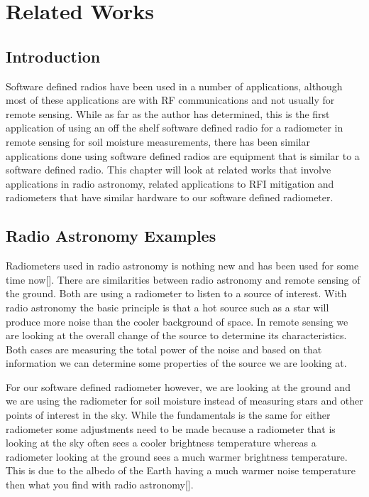 

\chapter{Related Works}

\section{Introduction}
Software defined radios have been used in a number of applications, although most of these applications are with RF communications and not usually for remote sensing.  While as far as the author has determined, this is the first application of using an off the shelf software defined radio for a radiometer in remote sensing for soil moisture measurements, there has been similar applications done using software defined radios are equipment that is similar to a software defined radio.  This chapter will look at related works that involve applications in radio astronomy, related applications to RFI mitigation and radiometers that have similar hardware to our software defined radiometer.

\section{Radio Astronomy Examples}
Radiometers used in radio astronomy is nothing new and has been used for some time now[\cite{Ohm}]. There are similarities between radio astronomy and remote sensing of the ground.  Both are using a radiometer to listen to a source of interest.  With radio astronomy the basic principle is that a hot source such as a star will produce more noise than the cooler background of space.  In remote sensing we are looking at the overall change of the source to determine its characteristics.  Both cases are measuring the total power of the noise and based on that information we can determine some properties of the source we are looking at.

For our software defined radiometer however, we are looking at the ground and we are using the radiometer for soil moisture instead of measuring stars and other points of interest in the sky.  While the fundamentals is the same for either radiometer some adjustments need to be made because a radiometer that is looking at the sky often sees a cooler brightness temperature whereas a radiometer looking at the ground sees a much warmer brightness temperature.  This is due to the albedo of the Earth having a much warmer noise temperature then what you find with radio astronomy[\cite{Tiuri}].

